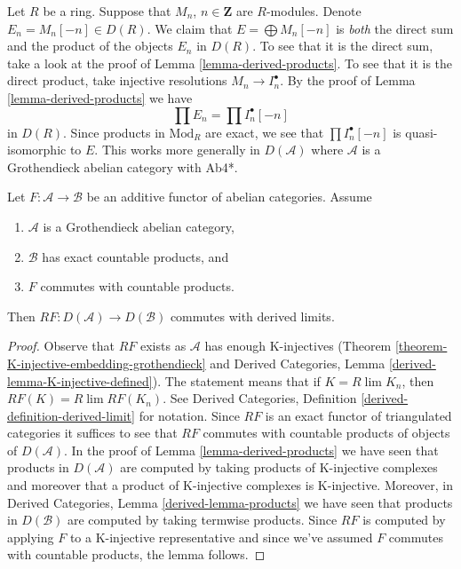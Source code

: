 \begin{remark}
\label{remark-direct-sum-product-derived}
Let $R$ be a ring. Suppose that $M_n$, $n \in \mathbf{Z}$ are $R$-modules.
Denote $E_n = M_n[-n] \in D(R)$. We claim that $E = \bigoplus M_n[-n]$ is
{\it both} the direct sum and the product of the objects $E_n$ in $D(R)$.
To see that it is the direct sum, take a look at the proof of
Lemma \ref{lemma-derived-products}.
To see that it is the direct product, take injective resolutions
$M_n \to I_n^\bullet$. By the proof of
Lemma \ref{lemma-derived-products}
we have
$$
\prod E_n = \prod I_n^\bullet[-n]
$$
in $D(R)$. Since products in $\text{Mod}_R$ are exact, we see that
$\prod I_n^\bullet[-n]$ is quasi-isomorphic to $E$. This works more generally
in $D(\mathcal{A})$ where $\mathcal{A}$ is a Grothendieck abelian
category with Ab4*.
\end{remark}

\begin{lemma}
\label{lemma-RF-commutes-with-Rlim}
Let $F : \mathcal{A} \to \mathcal{B}$ be an additive functor of
abelian categories. Assume
\begin{enumerate}
\item $\mathcal{A}$ is a Grothendieck abelian category,
\item $\mathcal{B}$ has exact countable products, and
\item $F$ commutes with countable products.
\end{enumerate}
Then
$RF : D(\mathcal{A}) \to D(\mathcal{B})$ commutes with derived limits.
\end{lemma}

\begin{proof}
Observe that $RF$ exists as $\mathcal{A}$ has enough K-injectives
(Theorem \ref{theorem-K-injective-embedding-grothendieck}
and
Derived Categories, Lemma \ref{derived-lemma-K-injective-defined}).
The statement means that if $K = R\lim K_n$, then
$RF(K) = R\lim RF(K_n)$. See
Derived Categories, Definition \ref{derived-definition-derived-limit}
for notation. Since $RF$ is an exact functor of triangulated
categories it suffices to see that $RF$ commutes with countable
products of objects of $D(\mathcal{A})$. In the proof of
Lemma \ref{lemma-derived-products}
we have seen that products in $D(\mathcal{A})$ are computed by
taking products of K-injective complexes and moreover that a
product of K-injective complexes is K-injective.
Moreover, in Derived Categories, Lemma
\ref{derived-lemma-products}
we have seen that products in $D(\mathcal{B})$ are computed
by taking termwise products.
Since $RF$ is computed by applying $F$ to a K-injective
representative and since we've assumed $F$ commutes with
countable products, the lemma follows.
\end{proof}

